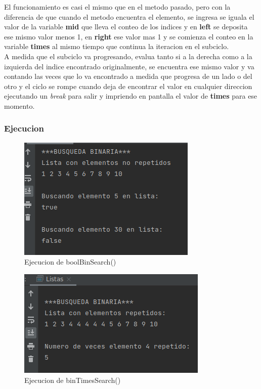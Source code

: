 \documentclass{article}
\begin{document}
\begin{enumerate}
					El funcionamiento es casi el mismo que en el metodo pasado, pero con la diferencia de que cuando el metodo encuentra el elemento, se ingresa se iguala el valor de la variable \textbf{mid} que lleva el conteo de los indices y en \textbf{left} se deposita ese mismo valor menos 1, en \textbf{right} ese valor mas 1 y se comienza el conteo en la variable \textbf{times} al mismo tiempo que continua la iteracion en el subciclo.\\
					
					A medida que el subciclo va progresando, evalua tanto si a la derecha como a la izquierda del indice encontrado originalmente, se encuentra ese mismo valor y va contando las veces que lo va encontrado a medida que progresa de un lado o del otro y el ciclo se rompe cuando deja de encontrar el valor en cualquier direccion ejecutando un \emph{break} para salir y impriendo en pantalla el valor de \textbf{times} para ese momento.
					
				\end{enumerate}
			
			\subsubsection{Ejecucion}
			
			\begin{figure}[H]
				\centering
				\includegraphics[scale = 1]{images/e3.png}
				\caption{Ejecucion de boolBinSearch()}
			\end{figure}
		
			\begin{figure}[H]
				\centering
				\includegraphics[scale = 0.9]{images/e32.png}
				\caption{Ejecucion de binTimesSearch()}
			\end{figure}
			
\end{document}
